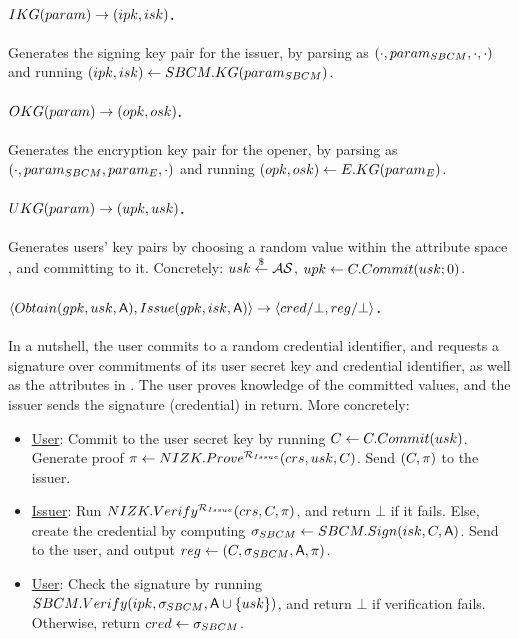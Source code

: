 \paragraph{$IKG(param) \rightarrow (ipk,isk)$.} %
Generates the signing key pair for the issuer, by parsing \parm as
$(\cdot,param_{SBCM},\cdot,\cdot)$ and running $(ipk,isk) \gets
SBCM.KG(param_{SBCM})$.

\paragraph{$OKG(param) \rightarrow (opk,osk)$.} %
Generates the encryption key pair for the opener, by parsing \parm as
$(\cdot,param_{SBCM},param_{E},\cdot)$ and running $(opk,osk) \gets
E.KG(param_{E})$.

\paragraph{$UKG(param) \rightarrow (upk,usk)$.} %
Generates users' key pairs by choosing a random value within the attribute space
\AttrSpace, and committing to it. Concretely: $usk \stackrel{\$}{\gets} \mathcal{AS}$, $upk
\gets C.Commit(usk; 0)$.

\paragraph{$\langle Obtain(gpk,usk,\mathsf{A}),Issue(gpk,isk,\mathsf{A}) \rangle
  \rightarrow \langle cred/\bot,reg/\bot \rangle$.} %
In a nutshell, the user commits to a random credential identifier, and requests
a signature over commitments of its user secret key and credential identifier,
as well as the attributes in \Attrs. The user proves knowledge of the committed
values, and the issuer sends the signature (credential) in return. More
concretely:

\begin{itemize}
\item \underline{User}: Commit to the user secret key by running $C \gets
  C.Commit(usk)$. Generate proof $\pi \gets
  NIZK.Prove^{\mathcal{R}_{Issue}}(crs,usk,C)$. Send $(C,
  \pi)$ to the issuer.
\item \underline{Issuer}: Run $NIZK.Verify^{\mathcal{R}_{Issue}}(crs,
  C,\pi)$, and return $\bot$ if it fails. Else, create the credential
  by computing $\sigma_{SBCM} \gets SBCM.Sign(isk,C,\mathsf{A})$. Send \SBCMsig to the
  user, and output $reg \gets (C,\sigma_{SBCM},\mathsf{A},\pi)$.
\item \underline{User}: Check the signature by running $SBCM.Verify(ipk,
  \sigma_{SBCM},\mathsf{A} \cup \lbrace usk \rbrace)$, and return $\bot$ if
  verification fails. Otherwise, return $cred \gets \sigma_{SBCM}$.
\end{itemize}

